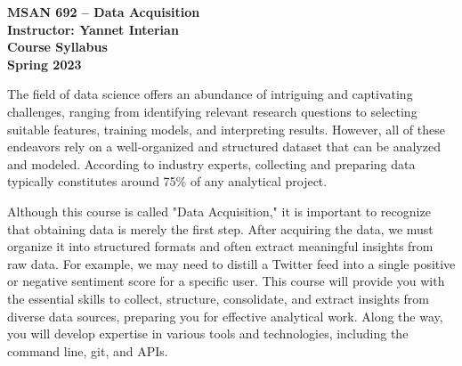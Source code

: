 \documentclass[11pt]{article}
\begin{document}
\pagestyle{empty}

\noindent \begin{center}
\begin{Large}\textbf{MSAN 692 -- Data Acquisition}\\
\textbf{Instructor: Yannet Interian}\\
\textbf{Course Syllabus}\\
\textbf{Spring 2023}\\\end{Large}
\end{center}

\vspace{0.15in}


The field of data science offers an abundance of intriguing and captivating challenges, ranging from identifying relevant research questions to selecting suitable features, training models, and interpreting results. However, all of these endeavors rely on a well-organized and structured dataset that can be analyzed and modeled. According to industry experts, collecting and preparing data typically constitutes around 75\% of any analytical project.

Although this course is called "Data Acquisition," it is important to recognize that obtaining data is merely the first step. After acquiring the data, we must organize it into structured formats and often extract meaningful insights from raw data. For example, we may need to distill a Twitter feed into a single positive or negative sentiment score for a specific user. This course will provide you with the essential skills to collect, structure, consolidate, and extract insights from diverse data sources, preparing you for effective analytical work. Along the way, you will develop expertise in various tools and technologies, including the command line, git, and APIs.

\vspace{0.25in}
\end{document}
